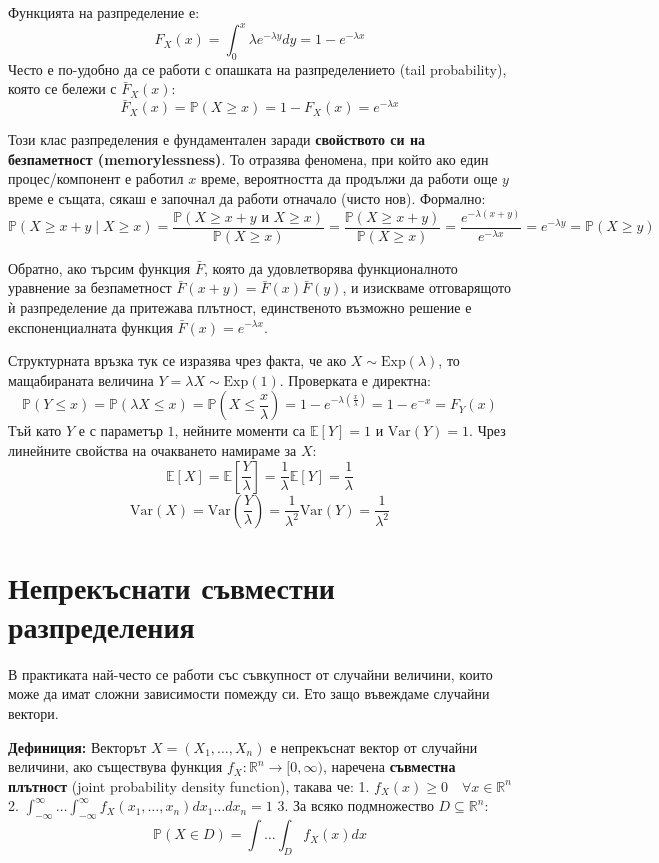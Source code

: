 \documentclass{article}
\begin{document}
Функцията на разпределение е:
\[
F_X(x) = \int_{0}^{x} \lambda e^{-\lambda y} dy = 1 - e^{-\lambda x}
\]
Често е по-удобно да се работи с опашката на разпределението (tail probability), която се бележи с $\bar{F}_X(x)$:
\[
\bar{F}_X(x) = \mathbb{P}(X \ge x) = 1 - F_X(x) = e^{-\lambda x}
\]

Този клас разпределения е фундаментален заради \textbf{свойството си на безпаметност (memorylessness)}. То отразява феномена, при който ако един процес/компонент е работил $x$ време, вероятността да продължи да работи още $y$ време е същата, сякаш е започнал да работи отначало (чисто нов). Формално:
\[
\mathbb{P}(X \ge x+y \mid X \ge x) = \frac{\mathbb{P}(X \ge x+y \text{ и } X \ge x)}{\mathbb{P}(X \ge x)} = \frac{\mathbb{P}(X \ge x+y)}{\mathbb{P}(X \ge x)} = \frac{e^{-\lambda(x+y)}}{e^{-\lambda x}} = e^{-\lambda y} = \mathbb{P}(X \ge y)
\]

Обратно, ако търсим функция $\bar{F}$, която да удовлетворява функционалното уравнение за безпаметност $\bar{F}(x+y) = \bar{F}(x)\bar{F}(y)$, и изискваме отговарящото ѝ разпределение да притежава плътност, единственото възможно решение е експоненциалната функция $\bar{F}(x) = e^{-\lambda x}$.

Структурната връзка тук се изразява чрез факта, че ако $X \sim \text{Exp}(\lambda)$, то мащабираната величина $Y = \lambda X \sim \text{Exp}(1)$. Проверката е директна:
\[
\mathbb{P}(Y \le x) = \mathbb{P}(\lambda X \le x) = \mathbb{P}\left(X \le \frac{x}{\lambda}\right) = 1 - e^{-\lambda \left(\frac{x}{\lambda}\right)} = 1 - e^{-x} = F_Y(x)
\]
Тъй като $Y$ е с параметър $1$, нейните моменти са $\mathbb{E}[Y] = 1$ и $\text{Var}(Y) = 1$. Чрез линейните свойства на очакването намираме за $X$:
\[
\mathbb{E}[X] = \mathbb{E}\left[\frac{Y}{\lambda}\right] = \frac{1}{\lambda}\mathbb{E}[Y] = \frac{1}{\lambda}
\]
\[
\text{Var}(X) = \text{Var}\left(\frac{Y}{\lambda}\right) = \frac{1}{\lambda^2}\text{Var}(Y) = \frac{1}{\lambda^2}
\]

\section{Непрекъснати съвместни разпределения}

В практиката най-често се работи със съвкупност от случайни величини, които може да имат сложни зависимости помежду си. Ето защо въвеждаме случайни вектори.

\textbf{Дефиниция:} Векторът $X = (X_1, \dots, X_n)$ е непрекъснат вектор от случайни величини, ако съществува функция $f_X: \mathbb{R}^n \to [0, \infty)$, наречена \textbf{съвместна плътност} (joint probability density function), такава че:
1. $f_X(x) \ge 0 \quad \forall x \in \mathbb{R}^n$
2. $\int_{-\infty}^{\infty} \dots \int_{-\infty}^{\infty} f_X(x_1, \dots, x_n) dx_1 \dots dx_n = 1$
3. За всяко подмножество $D \subseteq \mathbb{R}^n$: 
   \[
   \mathbb{P}(X \in D) = \int \dots \int_D f_X(x) dx
   \]
\end{document}
